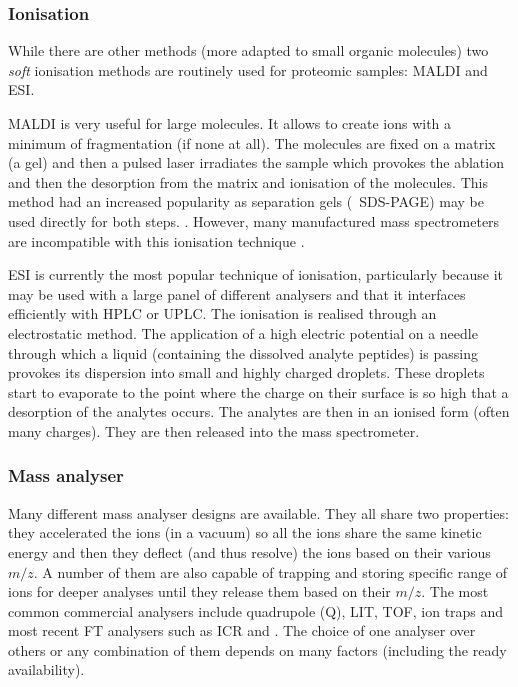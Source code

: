 \subsubsection{Ionisation}

While there are other methods (more adapted to small organic molecules)
two \emph{soft} ionisation methods are routinely used for proteomic samples:
\acrfull{MALDI} and \acrfull{ESI}.

\gls{MALDI} is very useful for large molecules. It allows to create ions with a
minimum of fragmentation (if none at all). The molecules are fixed on a matrix
(a gel) and then a pulsed \gls{laser} irradiates the sample which provokes the
ablation and then the desorption from the matrix and ionisation of the molecules.
This method had an increased popularity as separation gels (\eg\ \gls{SDS-PAGE})
may be used directly for both steps. . However, many
manufactured mass spectrometers are incompatible with this ionisation technique
.

\gls{ESI} is currently the most popular technique of ionisation, particularly
because it may be used with a large panel of different analysers and that it
interfaces efficiently with \gls{HPLC} or \gls{UPLC}. The ionisation is realised
through an electrostatic method. The application of a high electric potential on
a needle through which a liquid (containing the dissolved analyte peptides)
is passing provokes its dispersion into small and highly charged droplets.
These droplets start to evaporate to the point where the charge on their surface
is so high that a desorption of the analytes occurs.  The analytes are then
in an ionised form (often many charges). They are then released into the mass
spectrometer. 

\subsubsection{Mass analyser}

Many different mass analyser designs are available. They all share two properties:
they accelerated the ions (in a vacuum) so all the ions share the same kinetic
energy and then they deflect (and thus resolve) the ions based on
their various $m/z$.  A number of them are also
capable of trapping and storing specific range of ions for deeper analyses until
they release them based on their $m/z$.
The most common commercial analysers include quadrupole (Q), \acrfull{LIT},
\acrfull{TOF}, ion traps and most recent \gls{FT} analysers such as \acrfull{ICR}
and \orbi. The choice of one analyser over others or any combination of them
depends on many factors (including the ready availability). 

